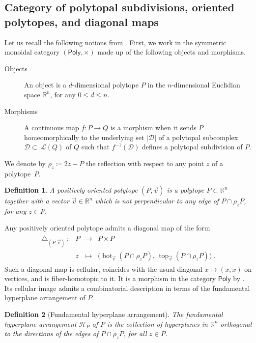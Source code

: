 \documentclass[twoside, 12pt]{amsart}
\newtheorem{definition}{Definition}[section]
\theoremstyle{remark}
\newcommand{\RR}{\mathbb{R}}
\newcommand{\La}{\mathcal{L}}
\newcommand{\PolySub}{\mathsf{Poly}}
\DeclareMathOperator{\tp}{top}
\DeclareMathOperator{\bm}{bot}
\begin{document}
\subsection{Category of polytopal subdivisions, oriented polytopes, and diagonal maps}
Let us recall the following notions from \cite[Section~2.1]{MTTV19}. 
First, we work in the symmetric monoidal category $(\PolySub, \times)$ made up of the following objects and morphisms.
\begin{description}
\item[{\sc Objects}] An object is a $d$-dimensional  polytope $P$ in the $n$-dimensional Euclidian space $\RR^n$, for any $0\leq d\leq n$.
\item[{\sc Morphisms}] A continuous map  $f: P\to Q$ is a morphism when 
it sends  $P$ homeomorphically to the underlying set $|\mathcal{D}|$ of a polytopal subcomplex $\mathcal{D}\subset~\La(Q)$ of $Q$ 
such that $f^{-1}(\mathcal D)$ defines a polytopal subdivision of $P$.
\end{description}

We denote by $\rho_z\coloneqq 2z-P$ the reflection with respect to any point $z$ of a polytope~$P$. 

\begin{definition}
A \emph{positively oriented polytope} $(P, \vec v)$ is a polytope $P \subset \RR^n$ together with a vector $\vec v\in \RR^n$ which is not perpendicular to any edge of $P\cap \rho_z P$, for any $z \in P$.
\end{definition}

Any positively oriented polytope admits a diagonal map of the form
\begin{align*}
\begin{array}{rlcl}
\triangle_{(P,\vec v)}\  : & P &\to  &P \times P\\
&z & \mapsto& 
\bigl(\bm_{\vec v}(P\cap \rho_zP),\,  \tp_{\vec v}(P\cap \rho_z P)\bigr) \ .
\end{array}
\end{align*}
Such a diagonal map is cellular, coincides with the usual diagonal $x\mapsto (x, x)$ on vertices, and is fiber-homotopic to it. It is a morphism in the category $\PolySub$ by \cite[Proposition~5]{MTTV19}.
Its cellular image admits a combinatorial description in terms of the fundamental hyperplane arrangement of $P$.

\begin{definition}[Fundamental hyperplane arrangement]
  \label{def:fundamentalhyperplane} 
  The \emph{fundamental hyperplane arrangement} $\mathcal{H}_P$ of $P$ is the collection of hyperplanes in $\RR^n$ orthogonal to the directions of the edges of $P\cap\rho_z P$, for all $z \in P$. 
\end{definition}
\end{document}
